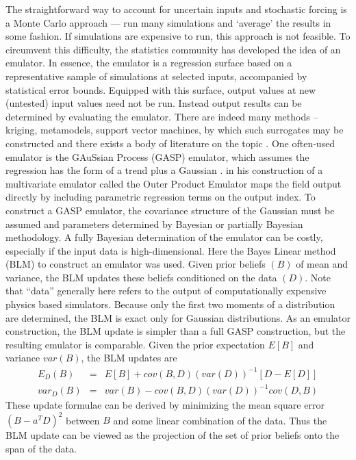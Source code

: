 \documentclass[12pt]{article}
\begin{document}
The straightforward way to account for uncertain inputs and stochastic
forcing is a Monte Carlo approach --- run many simulations and
`average' the results in some fashion. If simulations are expensive to
run, this approach is not feasible. To circumvent this difficulty, the
statistics community has developed the idea of an emulator.  In
essence, the emulator is a regression surface based on a
representative sample of simulations at selected inputs, accompanied
by statistical error bounds. Equipped with this surface, output values
at new (untested) input values need not be run.  Instead output
results can be determined by evaluating the emulator. There are indeed
many methods -- kriging, metamodels, support vector machines, by
which such surrogates may be constructed and there exists a body of
literature on the topic \citep{simpson1,simpson2}.  One often-used
emulator is the GAuSsian Process (GASP) emulator, which assumes the
regression has the form of a trend plus a Gaussian
\citep{kennedy2001bcc, ContiOHagan, ohagan2006bac, bayarriusc}. 
\citet{Rougier2008} in his construction of a multivariate emulator 
called the Outer Product Emulator maps 
 the field output directly by including parametric regression terms on the output index.
 To construct a GASP emulator, the covariance structure of the Gaussian
must be assumed and parameters determined by Bayesian or partially
Bayesian methodology.  A fully Bayesian determination of the emulator
can be costly, especially if the input data is high-dimensional.  Here
the Bayes Linear method (BLM) \citep{blm1tutor} to construct an
emulator was used. Given prior beliefs $(B)$ of mean and variance, the BLM
updates these beliefs conditioned on the data $(D)$.  Note that
``data'' generally here refers to the output of computationally
expensive physics based simulators.  Because only the first two
moments of a distribution are determined, the BLM is exact only for
Gaussian distributions.  As an emulator construction, the BLM update
is simpler than a full GASP construction, but the resulting emulator
is comparable.  Given the prior expectation $E[B]$ and variance
$var(B)$, the BLM updates are
\begin{eqnarray} \label{blupdate}
E_D(B) &=& E[B] + cov(B,D) (var(D))^{-1} [D-E[D]] \\ \nonumber
var_D(B) &=& var(B) - cov(B,D) (var(D))^{-1} cov(D,B)
\end{eqnarray}
These update formulae can be derived by minimizing the mean square
error $(B - a^T D)^2$ between $B$ and some linear combination of the
data. Thus the BLM update can be viewed as the projection of the set
of prior beliefs onto the span of the data.
\end{document}
